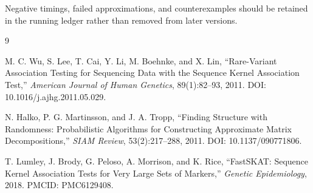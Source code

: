 \documentclass[11pt]{article}
\theoremstyle{definition}
\theoremstyle{remark}
\begin{document}
Negative timings, failed approximations, and counterexamples should be retained
in the running ledger rather than removed from later versions.


\begin{thebibliography}{9}

M. C. Wu, S. Lee, T. Cai, Y. Li, M. Boehnke, and X. Lin,
``Rare-Variant Association Testing for Sequencing Data with the Sequence
Kernel Association Test,''
\emph{American Journal of Human Genetics}, 89(1):82--93, 2011.
DOI: 10.1016/j.ajhg.2011.05.029.

N. Halko, P. G. Martinsson, and J. A. Tropp,
``Finding Structure with Randomness: Probabilistic Algorithms for Constructing
Approximate Matrix Decompositions,''
\emph{SIAM Review}, 53(2):217--288, 2011.
DOI: 10.1137/090771806.

T. Lumley, J. Brody, G. Peloso, A. Morrison, and K. Rice,
``FastSKAT: Sequence Kernel Association Tests for Very Large Sets of Markers,''
\emph{Genetic Epidemiology}, 2018.
PMCID: PMC6129408.

\end{thebibliography}
\end{document}
